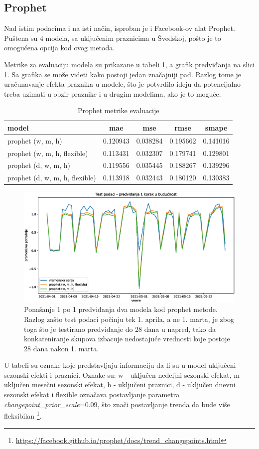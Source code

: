 \documentclass[12pt,oneside]{memoir}
\begin{document}
\subsection{Prophet}
Nad istim podacima i na isti način, isproban je i Facebook-ov alat Prophet. Puštena su 4 modela, sa uključenim praznicima u Švedskoj, pošto je to omogućena opcija kod ovog metoda.

Metrike za evaluaciju modela su prikazane u tabeli \ref{tbl: prophet_dnevni}, a grafik predviđanja na slici \ref{fig: test_prophet}. Sa grafika se može videti kako postoji jedan značajniji pad. Razlog tome je uračunavanje efekta praznika u modele, što je potvrdilo ideju da potencijalno treba uzimati u obzir praznike i u drugim modelima, ako je to moguće.
\begin{table}
\centering
\caption{Prophet metrike evaluacije}
\label{tbl: prophet_dnevni}
\begin{tabular}{ |l|c|c|c|c|} 
\hline
model & mae & mse & rmse & smape \\
\hline
prophet (w, m, h) & 0.120943 & 0.038284 & 0.195662 & 0.141016 \\ 
prophet (w, m, h, flexible) & 0.113431 & 0.032307 & 0.179741 & 0.129801\\
prophet (d, w, m, h) & 0.119556 & 0.035445 & 0.188267 & 0.139296 \\
prophet (d, w, m, h, flexible) & 0.113918 & 0.032443 & 0.180120 & 0.130383\\
\hline
\end{tabular}
\end{table}

\begin{figure}[!ht]
  \centering
  \includegraphics[width=1\textwidth]{./grafici/test_dnevni_prophet.eps}
  \caption{Ponašanje 1 po 1 predviđanja dva modela kod prophet metode. Razlog zašto test podaci počinju tek 1. aprila, a ne 1. marta, je zbog toga što je testirano predviđanje do 28 dana u napred, tako da konkateniranje skupova izbacuje nedostajuće vrednosti koje postoje 28 dana nakon 1. marta.}
  \label{fig: test_prophet}
\end{figure}
U tabeli su oznake koje predstavljaju informaciju da li su u model uključeni sezonski efekti i praznici. Oznake su: w - uključen nedeljni sezonski efekat, m - uključen mesečni sezonski efekat, h - uključeni praznici, d - uključen dnevni sezonski efekat i flexible označava postavljanje parametra \textit{changepoint\_prior\_scale}=0.09, što znači postavljanje trenda da bude više fleksibilan \footnote{\url{https://facebook.github.io/prophet/docs/trend_changepoints.html}}. 
\end{document}
